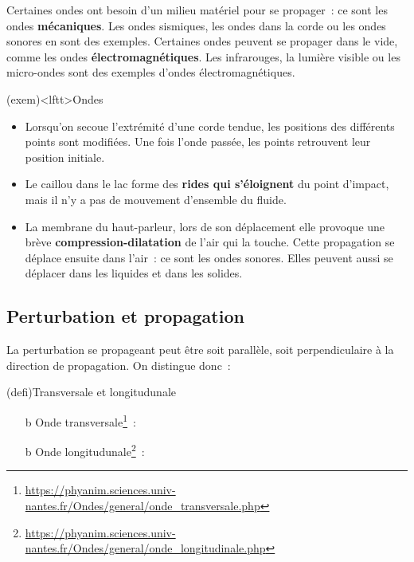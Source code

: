 \documentclass[../../main/main.tex]{subfiles}
\begin{document}
Certaines ondes ont besoin d'un milieu matériel pour se propager~: ce sont les
ondes \textbf{mécaniques}. Les ondes sismiques, les ondes dans la corde ou les
ondes sonores en sont des exemples. Certaines ondes peuvent se propager dans le
vide, comme les ondes \textbf{électromagnétiques}. Les infrarouges, la lumière
visible ou les micro-ondes sont des exemples d'ondes électromagnétiques.

\begin{tcb}(exem)<lftt>{Ondes}
	\begin{itemize}
		\item Lorsqu'on secoue l'extrémité d'une corde tendue,
		      les positions des différents points sont modifiées. Une fois l'onde
		      passée, les points retrouvent leur position initiale.
		\item Le caillou dans le lac forme des \textbf{rides qui s'éloignent} du point
		      d'impact, mais il n'y a pas de mouvement d'ensemble du
		      fluide.
		\item La membrane du haut-parleur, lors de son déplacement elle provoque
		      une brève \textbf{compression-dilatation} de l'air qui la touche.
		      Cette propagation se déplace ensuite dans l'air~: ce sont les ondes
		      sonores. Elles peuvent aussi se déplacer dans les liquides et dans
		      les solides.
	\end{itemize}
\end{tcb}

\subsection{Perturbation et propagation}

La perturbation se propageant peut être soit parallèle, soit perpendiculaire à
la direction de propagation. On distingue donc~:

\begin{tcb*}(defi){Transversale et longitudunale}
	\begin{itemize}
		\item[b]{Onde transversale}\footnote{\url{https://phyanim.sciences.univ-nantes.fr/Ondes/general/onde_transversale.php}}~:
		\item[b]{Onde longitudunale}\footnote{\url{https://phyanim.sciences.univ-nantes.fr/Ondes/general/onde_longitudinale.php}}~:
	\end{itemize}
\end{tcb*}
\end{document}
